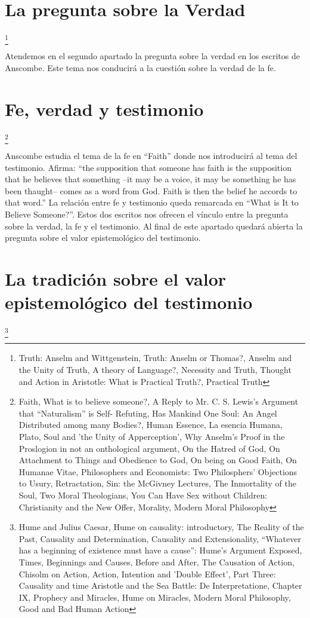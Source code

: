 \documentclass[../main.tex]{subfiles}
\begin{document}
\section{La pregunta sobre la Verdad}
\footnote{
Truth: Anselm and Wittgenstein, 
Truth: Anselm or Thomas?, 
Anselm and the Unity of Truth, 
A theory of Language?, 
Necessity and Truth, 
Thought and Action in Aristotle: What is Practical Truth?, 
Practical Truth
}

Atendemos en el segundo apartado la pregunta sobre la verdad en los escritos de Anscombe. Este tema nos conducirá a la cuestión sobre la verdad de la fe.

\section{Fe, verdad y testimonio}
\footnote{
Faith, 
What is to believe someone?, 
A Reply to Mr. C. S. Lewis's Argument that “Naturalism” is Self- Refuting, 
Has Mankind One Soul: An Angel Distributed among many Bodies?, 
Human Essence, 
La esencia Humana, 
Plato, Soul and 'the Unity of Apperception', 
Why Anselm's Proof in the Proslogion in not an onthological argument, 
On the Hatred of God, 
On Attachment to Things and Obedience to God, 
On being on Good Faith, 
On Humanae Vitae, 
Philosophers and Economists: Two Philosphers' Objections to Usury, 
Retractation, 
Sin: the McGivney Lectures, 
The Inmortality of the Soul, 
Two Moral Theologians, 
You Can Have Sex without Children: Christianity and the New Offer, 
Morality, 
Modern Moral Philosophy
}

Anscombe estudia el tema de la fe en ``Faith'' donde nos introducirá al tema del testimonio. Afirma: ``the supposition that someone has faith is the supposition that he believes that something --it may be a voice, it may be something he has been thaught-- comes as a word from God. Faith is then the belief he accords to that word.'' La relación entre fe y testimonio queda remarcada en ``What is It to Believe Someone?''. Estos dos escritos nos ofrecen el vínculo entre la pregunta sobre la verdad, la fe y el testimonio. Al final de este apartado quedará abierta la pregunta sobre el valor epistemológico del testimonio.

\section{La tradición sobre el valor epistemológico del testimonio}
\footnote{
Hume and Julius Caesar, 
Hume on causality: introductory, 
The Reality of the Past, 
Causality and Determination, 
Causality and Extensionality, 
“Whatever has a beginning of existence must have a cause”: Hume's Argument Exposed, 
Times, Beginnings and Causes, 
Before and After, 
The Causation of Action, 
Chisolm on Action, 
Action, Intention and 'Double Effect', 
Part Three: Causality and time
Aristotle and the Sea Battle: De Interpretatione, Chapter IX, 
Prophecy and Miracles, 
Hume on Miracles, 
Modern Moral Philosophy, 
Good and Bad Human Action
}
\end{document}
